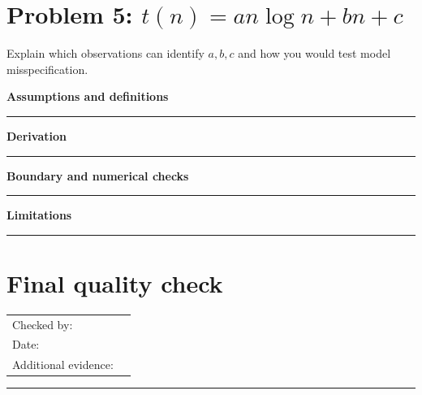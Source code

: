 \documentclass[11pt]{article}
\begin{document}
\section{\texorpdfstring{Problem 5: $t(n)=an\log n+bn+c$}{Problem 5: Leading terms of an n-log-n function}}
Explain which observations can identify $a,b,c$ and how you would test model misspecification.\par\medskip
\textbf{Assumptions and definitions}\par\vspace{0.7cm}\hrule\vspace{0.35cm}
\textbf{Derivation}\par\vspace{2.1cm}\hrule\vspace{0.3cm}
\textbf{Boundary and numerical checks}\par\vspace{1.1cm}\hrule\vspace{0.35cm}
\textbf{Limitations}\par\vspace{0.9cm}\hrule\vspace{0.35cm}
\clearpage
\section{Final quality check}
\begin{tabularx}{\linewidth}{@{}lX@{}}Checked by: & \hrulefill\\ Date: & \hrulefill\\ Additional evidence: & \hrulefill\\\end{tabularx}
\vspace{3cm}\hrule
\end{document}
